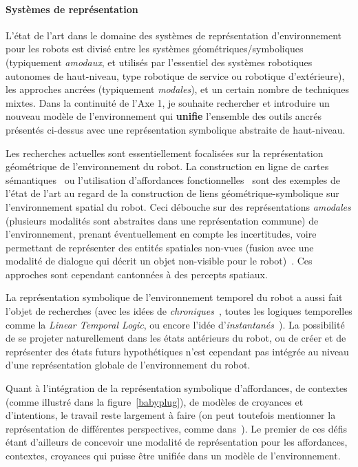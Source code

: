 \documentclass[a4paper]{article}
\begin{document}
\paragraph{Systèmes de représentation}

L'état de l'art dans le domaine des systèmes de représentation d'environnement
pour les robots est divisé entre les systèmes géométriques/symboliques
(typiquement \emph{amodaux}, et utilisés par l'essentiel des systèmes robotiques
autonomes de haut-niveau, type robotique de service ou robotique d'extérieure),
les approches ancrées (typiquement \emph{modales}), et un certain nombre de
techniques mixtes. Dans la continuité de l'Axe 1, je souhaite rechercher et
introduire un nouveau modèle de l'environnement qui \textbf{unifie} l'ensemble
des outils ancrés présentés ci-dessus avec une représentation symbolique
abstraite de haut-niveau.

Les recherches actuelles sont essentiellement focalisées sur la représentation
géométrique de l'environnement du robot. La construction en ligne de cartes
sémantiques~\cite{Nuechter2008, Galindo2008, Blodow2011} ou l'utilisation
d'affordances fonctionnelles~\cite{Varadarajan2011} sont des exemples de l'état
de l'art au regard de la construction de liens géométrique-symbolique sur
l'environnement spatial du robot. Ceci débouche sur des représentations
\emph{amodales} (plusieurs modalités sont abstraites dans une représentation
commune) de l'environnement, prenant éventuellement en compte les incertitudes,
voire permettant de représenter des entités spatiales non-vues (fusion avec une
modalité de dialogue qui décrit un objet non-visible pour le
robot)~\cite{Mavridis2006}. Ces approches sont cependant cantonnées à des
percepts spatiaux.

La représentation symbolique de l'environnement temporel du robot a aussi fait
l'objet de recherches (avec les idées de \emph{chroniques}~\cite{Ghallab1996},
toutes les logiques temporelles comme la \emph{Linear Temporal Logic}, ou encore
l'idée d'\emph{instantanés}~\cite{Mavridis2006}).  La possibilité de se projeter
naturellement dans les états antérieurs du robot, ou de créer et de représenter
des états futurs hypothétiques n'est cependant pas intégrée au niveau d'une
représentation globale de l'environnement du robot.

Quant à l'intégration de la représentation symbolique d'affordances, de
contextes (comme illustré dans la figure~\ref{babyplug}), de modèles de
croyances et d'intentions, le travail reste largement à faire (on peut toutefois
mentionner la représentation de différentes perspectives, comme
dans~\cite{ros2010which}). Le premier de ces défis étant d'ailleurs de concevoir
une modalité de représentation pour les affordances, contextes, croyances qui
puisse être unifiée dans un modèle de l'environnement.
\end{document}
